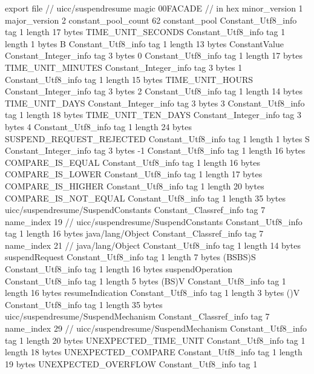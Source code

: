 export file {		// uicc/suspendresume
	magic	00FACADE		 // in hex
	minor_version	1
	major_version	2
	constant_pool_count	62
	constant_pool {
		Constant_Utf8_info {
			tag	1
			length	17
			bytes	TIME_UNIT_SECONDS
		}
		Constant_Utf8_info {
			tag	1
			length	1
			bytes	B
		}
		Constant_Utf8_info {
			tag	1
			length	13
			bytes	ConstantValue
		}
		Constant_Integer_info {
			tag	3
			bytes	0
		}
		Constant_Utf8_info {
			tag	1
			length	17
			bytes	TIME_UNIT_MINUTES
		}
		Constant_Integer_info {
			tag	3
			bytes	1
		}
		Constant_Utf8_info {
			tag	1
			length	15
			bytes	TIME_UNIT_HOURS
		}
		Constant_Integer_info {
			tag	3
			bytes	2
		}
		Constant_Utf8_info {
			tag	1
			length	14
			bytes	TIME_UNIT_DAYS
		}
		Constant_Integer_info {
			tag	3
			bytes	3
		}
		Constant_Utf8_info {
			tag	1
			length	18
			bytes	TIME_UNIT_TEN_DAYS
		}
		Constant_Integer_info {
			tag	3
			bytes	4
		}
		Constant_Utf8_info {
			tag	1
			length	24
			bytes	SUSPEND_REQUEST_REJECTED
		}
		Constant_Utf8_info {
			tag	1
			length	1
			bytes	S
		}
		Constant_Integer_info {
			tag	3
			bytes	-1
		}
		Constant_Utf8_info {
			tag	1
			length	16
			bytes	COMPARE_IS_EQUAL
		}
		Constant_Utf8_info {
			tag	1
			length	16
			bytes	COMPARE_IS_LOWER
		}
		Constant_Utf8_info {
			tag	1
			length	17
			bytes	COMPARE_IS_HIGHER
		}
		Constant_Utf8_info {
			tag	1
			length	20
			bytes	COMPARE_IS_NOT_EQUAL
		}
		Constant_Utf8_info {
			tag	1
			length	35
			bytes	uicc/suspendresume/SuspendConstants
		}
		Constant_Classref_info {
			tag	7
			name_index	19		// uicc/suspendresume/SuspendConstants
		}
		Constant_Utf8_info {
			tag	1
			length	16
			bytes	java/lang/Object
		}
		Constant_Classref_info {
			tag	7
			name_index	21		// java/lang/Object
		}
		Constant_Utf8_info {
			tag	1
			length	14
			bytes	suspendRequest
		}
		Constant_Utf8_info {
			tag	1
			length	7
			bytes	(BSBS)S
		}
		Constant_Utf8_info {
			tag	1
			length	16
			bytes	suspendOperation
		}
		Constant_Utf8_info {
			tag	1
			length	5
			bytes	(BS)V
		}
		Constant_Utf8_info {
			tag	1
			length	16
			bytes	resumeIndication
		}
		Constant_Utf8_info {
			tag	1
			length	3
			bytes	()V
		}
		Constant_Utf8_info {
			tag	1
			length	35
			bytes	uicc/suspendresume/SuspendMechanism
		}
		Constant_Classref_info {
			tag	7
			name_index	29		// uicc/suspendresume/SuspendMechanism
		}
		Constant_Utf8_info {
			tag	1
			length	20
			bytes	UNEXPECTED_TIME_UNIT
		}
		Constant_Utf8_info {
			tag	1
			length	18
			bytes	UNEXPECTED_COMPARE
		}
		Constant_Utf8_info {
			tag	1
			length	19
			bytes	UNEXPECTED_OVERFLOW
		}
		Constant_Utf8_info {
			tag	1
}}}
